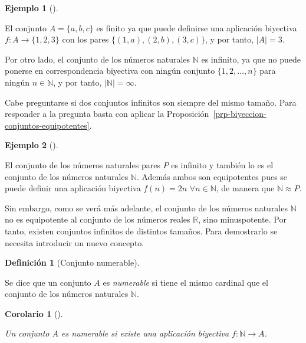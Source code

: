 \documentclass[
  a4paper,
]{scrreport}
\theoremstyle{definition}
\newtheorem{example}{Ejemplo}[chapter]
\theoremstyle{plain}
\newtheorem{corollary}{Corolario}[chapter]
\theoremstyle{plain}
\theoremstyle{definition}
\newtheorem{definition}{Definición}[chapter]
\theoremstyle{plain}
\theoremstyle{remark}
\begin{document}
\begin{example}[]\protect\hypertarget{exm-conjunto-finito-infinito}{}\label{exm-conjunto-finito-infinito}

El conjunto \(A=\{a, b, c\}\) es finito ya que puede definirse una
aplicación biyectiva \(f:A\rightarrow \{1, 2, 3\}\) con los pares
\(\{(1,a),(2,b), (3,c)\}\), y por tanto, \(|A| = 3\).

Por otro lado, el conjunto de los números naturales \(\mathbb{N}\) es
infinito, ya que no puede ponerse en correspondencia biyectiva con
ningún conjunto \(\{1,2,\ldots,n\}\) para ningún \(n\in\mathbb{N}\), y
por tanto, \(|\mathbb{N}|=\infty\).

\end{example}

Cabe preguntarse si dos conjuntos infinitos son siempre del mismo
tamaño. Para responder a la pregunta basta con aplicar la
Proposición~\ref{prp-biyeccion-conjuntos-equipotentes}.

\begin{example}[]\protect\hypertarget{exm-conjunto-pares-equipotente-naturales}{}\label{exm-conjunto-pares-equipotente-naturales}

El conjunto de los números naturales pares \(P\) es infinito y también
lo es el conjunto de los números naturales \(\mathbb{N}\). Además ambos
son equipotentes pues se puede definir una aplicación biyectiva
\(f(n) = 2n\) \(\forall n\in\mathbb{N}\), de manera que
\(\mathbb{N}\approx P\).

\end{example}

Sin embargo, como se verá más adelante, el conjunto de los números
naturales \(\mathbb{N}\) no es equipotente al conjunto de los números
reales \(\mathbb{R}\), sino minuspotente. Por tanto, existen conjuntos
infinitos de distintos tamaños. Para demostrarlo se necesita introducir
un nuevo concepto.

\begin{definition}[Conjunto
numerable]\protect\hypertarget{def-conjuntos-numerables}{}\label{def-conjuntos-numerables}

Se dice que un conjunto \(A\) es \emph{numerable} si tiene el mismo
cardinal que el conjunto de los números naturales \(\mathbb{N}\).

\end{definition}

\begin{corollary}[]\protect\hypertarget{cor-biyeccion-conjunto-numerable}{}\label{cor-biyeccion-conjunto-numerable}

Un conjunto \(A\) es numerable si existe una aplicación biyectiva
\(f:\mathbb{N}\rightarrow A\).

\end{corollary}
\end{document}
